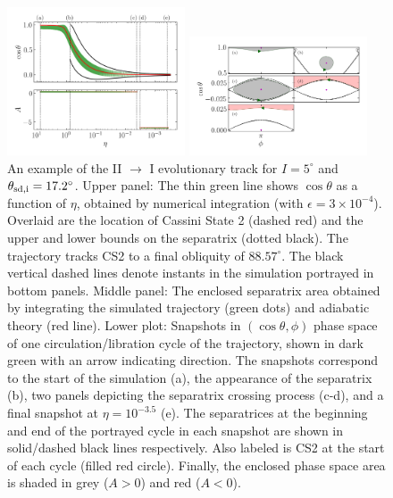 \documentclass[twocolumn,twocolappendix]{aastex63}
\newcommand*{\p}[1]{\left(#1\right)}
\begin{document}
\begin{figure}
    \centering
    \includegraphics[width=0.47\textwidth]{plots_diskdisp/3testo21.png}

    \includegraphics[width=0.47\textwidth]{plots_diskdisp/3testo21_subplots.png}
    \caption{An example of the II $\to$ I evolutionary track for $I = 5^\circ$
    and $\theta_{\rm sd, i} = 17.2^\circ$. Upper panel: The thin green line shows
    $\cos \theta$ as a function of $\eta$, obtained by numerical integration
    (with $\epsilon = 3 \times 10^{-4}$). Overlaid are the location of Cassini
    State 2 (dashed red) and the upper and lower bounds on the separatrix
    (dotted black). The trajectory tracks CS2 to a final obliquity of
    $88.57^\circ$. The black vertical dashed lines denote instants in the
    simulation  portrayed in bottom panels. Middle panel: The enclosed
    separatrix area obtained by integrating the simulated trajectory (green
    dots) and adiabatic theory (red line). Lower plot: Snapshots in $\p{\cos
    \theta, \phi}$ phase space of one circulation/libration cycle of the
    trajectory, shown in dark green with an arrow indicating direction. The
    snapshots correspond to the start of the simulation (a), the appearance of
    the separatrix (b), two panels depicting the separatrix crossing process
    (c-d), and a final snapshot at $\eta = 10^{-3.5}$ (e). The separatrices at
    the beginning and end of the portrayed cycle in each snapshot are shown in
    solid/dashed black lines respectively. Also labeled is CS2 at the start of
    each cycle (filled red circle). Finally, the enclosed phase space area is
    shaded in grey ($A > 0$) and red ($A < 0$).}\label{fig:ad_21}
\end{figure}
\end{document}
